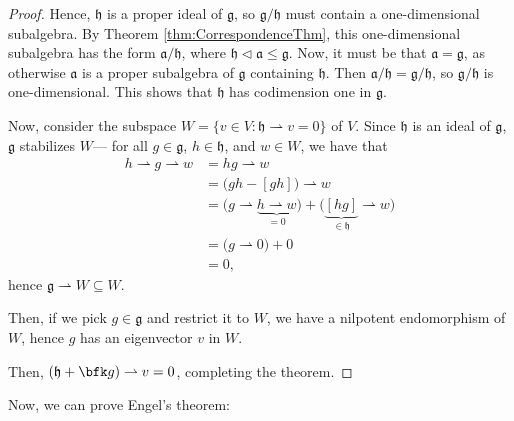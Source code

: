\documentclass{article}
\newcommand*\tle{\ensuremath{\mathrel{\lhd}}}
\newcommand{\lb}[1]{\ensuremath{\left[{#1}\right]}}
\newcommand*\frka{{\ensuremath{\mathfrak{a}}}}
\newcommand*\frkg{{\ensuremath{\mathfrak{g}}}}
\newcommand*\frkh{{\ensuremath{\mathfrak{h}}}}
\begin{document}
\begin{proof}
    Hence, $\frkh$ is a proper ideal of $\frkg$, so $\frkg/\frkh$ must contain a one-dimensional subalgebra.
    By Theorem \ref{thm:CorrespondenceThm}, this one-dimensional subalgebra has the form $\frka/\frkh$, where $\frkh \tle \frka \leq \frkg$.
    Now, it must be that $\frka = \frkg$, as otherwise $\frka$ is a proper subalgebra of $\frkg$ containing $\frkh$.
    Then $\frka/\frkh = \frkg/\frkh$, so $\frkg/\frkh$ is one-dimensional.
    This shows that $\frkh$ has codimension one in $\frkg$.

    Now, consider the subspace $W = \{ v \in V : \frkh \rightharpoonup v = 0 \}$ of $V$.
    Since $\frkh$ is an ideal of $\frkg$, $\frkg$ stabilizes $W$--- for all $g \in \frkg$, $h \in \frkh$, and $w \in W$, we have that
    \begin{align*}
        h \rightharpoonup g \rightharpoonup w
        &=
        hg \rightharpoonup w
        \\
        &= 
        \Big(gh - \lb{gh}\Big) \rightharpoonup w
        \\
        &=
        \Big( g \rightharpoonup \underbrace{h \rightharpoonup w}_{=0} \Big) + \Big(\underbrace{\lb{hg}}_{\in \frkh} \rightharpoonup w\Big)
        \\
        &=
        \Big( g \rightharpoonup 0 \Big) + 0
        \\
        &=
        0,
    \end{align*}
    hence $\frkg \rightharpoonup W \subseteq W$.

    Then, if we pick $g \in \frkg$ and restrict it to $W$, we have a nilpotent endomorphism of $W$, hence $g$ has an eigenvector $v$ in $W$.

    Then, $(\frkh + \bfk g) \rightharpoonup v = 0$, completing the theorem.
\end{proof}

Now, we can prove Engel's theorem:
\end{document}
